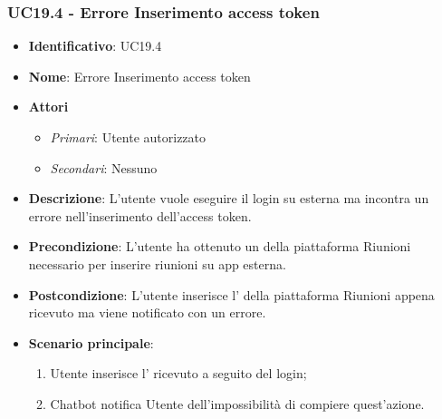 \subsubsection{UC19.4 - Errore Inserimento access token }
\begin{itemize}
	\item \textbf{Identificativo}: UC19.4
	\item \textbf{Nome}: Errore Inserimento access token
	\item \textbf{Attori}
	\begin{itemize} 
		\item \textit{Primari}: Utente autorizzato
		\item \textit{Secondari}: Nessuno
	\end{itemize}
	\item \textbf{Descrizione}: L'utente vuole eseguire il login su  esterna ma incontra un errore nell'inserimento dell'access token.
	\item \textbf{Precondizione}: L'utente ha ottenuto un  della piattaforma Riunioni necessario per inserire riunioni su app esterna.
	\item \textbf{Postcondizione}: L'utente inserisce l' della piattaforma Riunioni appena ricevuto ma viene notificato con un errore.
	\item \textbf{Scenario principale}: \begin{enumerate}
		\item Utente inserisce l' ricevuto a seguito del login; 
		\item Chatbot notifica Utente dell'impossibilità di compiere quest'azione.
	\end{enumerate}
\end{itemize}